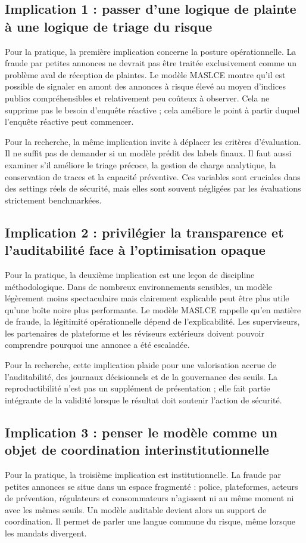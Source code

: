 \documentclass[10pt,a4paper]{article}
\begin{document}
\subsection{Implication 1 : passer d'une logique de plainte à une logique de triage du risque}
Pour la pratique, la première implication concerne la posture opérationnelle. La fraude par petites annonces ne devrait pas être traitée exclusivement comme un problème aval de réception de plaintes. Le modèle MASLCE montre qu'il est possible de signaler en amont des annonces à risque élevé au moyen d'indices publics compréhensibles et relativement peu coûteux à observer. Cela ne supprime pas le besoin d'enquête réactive ; cela améliore le point à partir duquel l'enquête réactive peut commencer.

Pour la recherche, la même implication invite à déplacer les critères d'évaluation. Il ne suffit pas de demander si un modèle prédit des labels finaux. Il faut aussi examiner s'il améliore le triage précoce, la gestion de charge analytique, la conservation de traces et la capacité préventive. Ces variables sont cruciales dans des settings réels de sécurité, mais elles sont souvent négligées par les évaluations strictement benchmarkées.

\subsection{Implication 2 : privilégier la transparence et l'auditabilité face à l'optimisation opaque}
Pour la pratique, la deuxième implication est une leçon de discipline méthodologique. Dans de nombreux environnements sensibles, un modèle légèrement moins spectaculaire mais clairement explicable peut être plus utile qu'une boîte noire plus performante. Le modèle MASLCE rappelle qu'en matière de fraude, la légitimité opérationnelle dépend de l'explicabilité. Les superviseurs, les partenaires de plateforme et les réviseurs extérieurs doivent pouvoir comprendre pourquoi une annonce a été escaladée.

Pour la recherche, cette implication plaide pour une valorisation accrue de l'auditabilité, des journaux décisionnels et de la gouvernance des seuils. La reproductibilité n'est pas un supplément de présentation ; elle fait partie intégrante de la validité lorsque le résultat doit soutenir l'action de sécurité.

\subsection{Implication 3 : penser le modèle comme un objet de coordination interinstitutionnelle}
Pour la pratique, la troisième implication est institutionnelle. La fraude par petites annonces se situe dans un espace fragmenté : police, plateformes, acteurs de prévention, régulateurs et consommateurs n'agissent ni au même moment ni avec les mêmes seuils. Un modèle auditable devient alors un support de coordination. Il permet de parler une langue commune du risque, même lorsque les mandats divergent.
\end{document}
